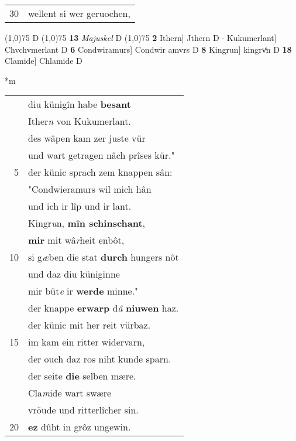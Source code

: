 \documentclass[8pt,a4paper,notitlepage]{article}
\begin{document}
\begin{table}[ht]
\begin{minipage}[t]{0.5\linewidth}
\begin{tabular}{rl}
30 & wellent si wer geruochen,\\ 
\end{tabular}
\scriptsize
\line(1,0){75} \newline
D \newline
\line(1,0){75} \newline
\textbf{13} \textit{Majuskel} D  \newline
\line(1,0){75} \newline
\textbf{2} Ithern] Jthern D  $\cdot$ Kukumerlant] Chvchvmerlant D \textbf{6} Condwiramurs] Condwir amvrs D \textbf{8} Kingrun] kingrvͦn D \textbf{18} Clamide] Chlamide D \newline
\end{minipage}
\hspace{0.5cm}
\begin{minipage}[t]{0.5\linewidth}
\small
\begin{center}*m
\end{center}
\begin{tabular}{rl}
 & diu künigîn habe \textbf{besant}\\ 
 & Ither\textit{n} von Kukumerlant.\\ 
 & des wâpen kam zer juste vür\\ 
 & und wart getragen nâch prîses kür."\\ 
5 & der künic sprach zem knappen sân:\\ 
 & "Condwieramurs wil mich hân\\ 
 & und ich ir lîp und ir lant.\\ 
 & Kingr\textit{u}n, \textbf{mîn schinschant},\\ 
 & \textbf{mir} mit wâ\textit{r}heit enbôt,\\ 
10 & si g\textit{æ}ben die stat \textbf{durch} hungers nôt\\ 
 & und daz diu küniginne\\ 
 & mir büt\textit{e} ir \textbf{werde} minne."\\ 
 & der knappe \textbf{erwarp} d\textit{â} \textbf{niuwen} haz.\\ 
 & der künic mit her reit vürbaz.\\ 
15 & im kam ein ritter widervarn,\\ 
 & der ouch daz ros niht kunde sparn.\\ 
 & der seite \textbf{die} selben mære.\\ 
 & Cla\textit{m}ide wart swære\\ 
 & vröude und ritterlîcher sin.\\ 
20 & \textbf{ez} dûht in grôz ungewin.\\ 

\end{tabular}
\end{minipage}
\end{table}
\end{document}
